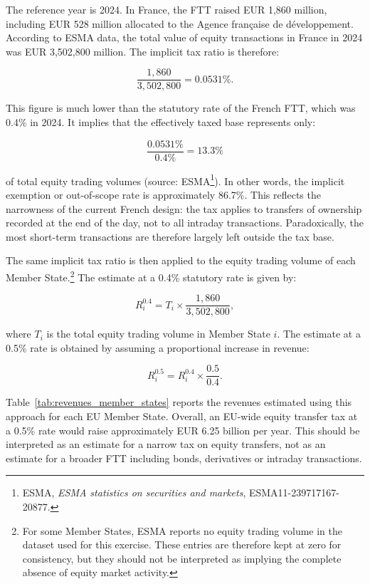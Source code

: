 \documentclass[../../main]{subfiles}
\begin{document}
The reference year is 2024. In France, the FTT raised EUR 1,860 million, including EUR 528 million allocated to the Agence française de développement. According to ESMA data, the total value of equity transactions in France in 2024 was EUR 3,502,800 million. The implicit tax ratio is therefore:

\[
\frac{1,860}{3,502,800} = 0.0531\%.
\]

This figure is much lower than the statutory rate of the French FTT, which was 0.4\% in 2024. It implies that the effectively taxed base represents only:

\[
\frac{0.0531\%}{0.4\%} = 13.3\%
\]

\noindent of total equity trading volumes (source: ESMA\footnote{ESMA, \textit{ESMA statistics on securities and markets}, ESMA11-239717167-20877.}). In other words, the implicit exemption or out-of-scope rate is approximately 86.7\%. This reflects the narrowness of the current French design: the tax applies to transfers of ownership recorded at the end of the day, not to all intraday transactions. Paradoxically, the most short-term transactions are therefore largely left outside the tax base.

The same implicit tax ratio is then applied to the equity trading volume of each Member State.\footnote{For some Member States, ESMA reports no equity trading volume in the dataset used for this exercise. These entries are therefore kept at zero for consistency, but they should not be interpreted as implying the complete absence of equity market activity.} The estimate at a 0.4\% statutory rate is given by:

\[
R_i^{0.4} = T_i \times \frac{1,860}{3,502,800},
\]

\noindent where \(T_i\) is the total equity trading volume in Member State \(i\). The estimate at a 0.5\% rate is obtained by assuming a proportional increase in revenue:

\[
R_i^{0.5} = R_i^{0.4} \times \frac{0.5}{0.4}.
\]

Table~\ref{tab:revenues_member_states} reports the revenues estimated using this approach for each EU Member State. Overall, an EU-wide equity transfer tax at a 0.5\% rate would raise approximately EUR 6.25 billion per year. This should be interpreted as an estimate for a narrow tax on equity transfers, not as an estimate for a broader FTT including bonds, derivatives or intraday transactions.
\end{document}
